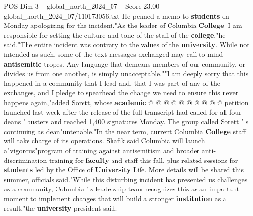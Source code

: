 \begin{textsample}{POS Dim 3 – global\_north\_2024\_07 – Score 23.00 – global\_north\_2024\_07/110173056.txt}
He penned a memo to \textbf{students} on Monday apologizing for the incident."As the leader of Columbia \textbf{College}, I am responsible for setting the culture and tone of the staff of the \textbf{college},"he said."The entire incident was contrary to the values of the \textbf{university}.
While not intended as such, some of the text messages exchanged may call to mind \textbf{antisemitic} tropes.
Any language that demeans members of our community, or divides us from one another, is simply unacceptable.""I am deeply sorry that this happened in a community that I lead and, that I was part of any of the exchanges, and I pledge to spearhead the change we need to ensure this never happens again,"added Sorett, whose \textbf{academic} @ @ @ @ @ @ @ @ @ @ petition launched last week after the release of the full transcript had called for all four deans ' ousters and reached 1,400 signatures Monday.
The group called Sorett ' s continuing as dean"untenable."In the near term, current Columbia \textbf{College} staff will take charge of its operations.
Shafik said Columbia will launch a"vigorous"program of training against antisemitism and broader anti-discrimination training for \textbf{faculty} and staff this fall, plus related sessions for \textbf{students} led by the Office of \textbf{University} Life.
More details will be shared this summer, officials said."While this disturbing incident has presented us challenges as a community, Columbia ' s leadership team recognizes this as an important moment to implement changes that will build a stronger \textbf{institution} as a result,"the \textbf{university} president said.

\end{textsample}
